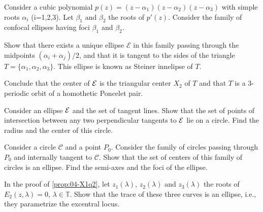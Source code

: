 

\begin{exercise}
Consider a cubic polynomial $p(z)=(z-\alpha_1)(z-\alpha_2)(z-\alpha_3)$ with simple roots $\alpha_i$ (i=1,2,3).
Let $\beta_1$ and $\beta_2$ the roots of $p'(z)$.
Consider the family of confocal ellipses having foci $\beta_1$ and $\beta_2$.

Show that there exists a unique ellipse $\mathcal E$ in this family passing through the midpoints $(\alpha_i+\alpha_j)/2$, and that it is tangent to the sides of the triangle $T=\{\alpha_1,\alpha_2,\alpha_3\}$. This ellipse is known as Steiner innelipse of $T$.

Conclude that the center of $\mathcal{E}$ is the triangular center  $X_2$ of $T$ and that $T$ is a 3-periodic orbit of a homothetic Poncelet pair.


\end{exercise}

\begin{exercise} Consider an ellipse $\mathcal{E}$ and the set of tangent lines. Show that the set of points of intersection between any two perpendicular
tangents to $\mathcal{E}$  lie on a circle. Find the radius and the center of this circle.
\end{exercise}

\begin{exercise}
Consider a circle $\mathcal{C}$ and a point $P_0$.   Consider the family of circles passing through $P_0$ and internally tangent to $\mathcal{C}$. Show that the set of centers of this family of circles is an ellipse.
Find the semi-axes and the foci of the ellipse.
\end{exercise}

\begin{exercise}
In the proof of \cref{prop:04-X1q2}, let $z_1(\lambda)$, $ z_2(\lambda) $ and $z_3(\lambda)$ the roots of   $E_2(z,\lambda)=0$, $\lambda \in \mathbb{T}$. Show that  the trace of these three curves is an ellipse, i.e., they parametrize the excentral locus.   
\end{exercise}